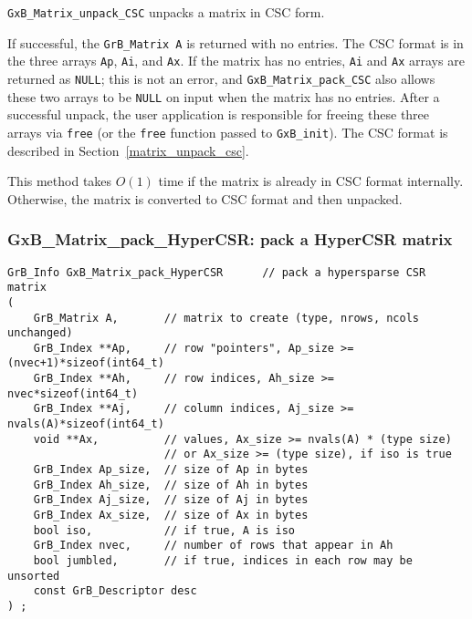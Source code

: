 \documentclass[12pt]{article}
\begin{document}
\verb'GxB_Matrix_unpack_CSC' unpacks a matrix in CSC form.

If successful, the \verb'GrB_Matrix A' is returned with no entries.
The CSC format is in the three arrays
\verb'Ap', \verb'Ai', and \verb'Ax'.  If the matrix has no entries, \verb'Ai'
and \verb'Ax' arrays are returned as \verb'NULL'; this is not an error, and
\verb'GxB_Matrix_pack_CSC' also allows these two arrays to be \verb'NULL' on
input when the matrix has no entries.  After a successful unpack, the user
application is responsible for freeing these three arrays via \verb'free' (or
the \verb'free' function passed to \verb'GxB_init').  The CSC format is
described in Section~\ref{matrix_unpack_csc}.

This method takes $O(1)$ time if the matrix is already in CSC format
internally.  Otherwise, the matrix is converted to CSC format and then
unpacked.


\newpage
\subsubsection{{\sf GxB\_Matrix\_pack\_HyperCSR:} pack a HyperCSR matrix}
\label{matrix_pack_hypercsr}

\begin{mdframed}[userdefinedwidth=6in]
{\footnotesize
\begin{verbatim}
GrB_Info GxB_Matrix_pack_HyperCSR      // pack a hypersparse CSR matrix
(
    GrB_Matrix A,       // matrix to create (type, nrows, ncols unchanged)
    GrB_Index **Ap,     // row "pointers", Ap_size >= (nvec+1)*sizeof(int64_t)
    GrB_Index **Ah,     // row indices, Ah_size >= nvec*sizeof(int64_t)
    GrB_Index **Aj,     // column indices, Aj_size >= nvals(A)*sizeof(int64_t)
    void **Ax,          // values, Ax_size >= nvals(A) * (type size)
                        // or Ax_size >= (type size), if iso is true
    GrB_Index Ap_size,  // size of Ap in bytes
    GrB_Index Ah_size,  // size of Ah in bytes
    GrB_Index Aj_size,  // size of Aj in bytes
    GrB_Index Ax_size,  // size of Ax in bytes
    bool iso,           // if true, A is iso
    GrB_Index nvec,     // number of rows that appear in Ah
    bool jumbled,       // if true, indices in each row may be unsorted
    const GrB_Descriptor desc
) ;
\end{verbatim}
} \end{mdframed}
\end{document}
